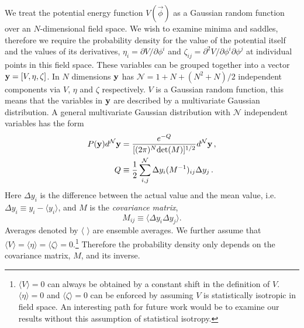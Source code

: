 \documentclass[12pt]{article}
\newcommand{\sh}[1]{\textcolor{brown}{#1}}
\begin{document}
We treat the potential energy function $V({\vec{\phi}})$ as a Gaussian random function over an $N$-dimensional field space. We wish to examine minima and saddles, therefore we require the probability density for the value of the potential itself and the values of its derivatives, $\eta_i = \partial V/\partial \phi^i$ and $\zeta_{ij}=\partial^2 V/\partial \phi^i\partial \phi^j$ at individual points in this field space. These variables can be grouped together into a vector ${\bf y} = [V,\eta,\zeta]$. In $N$ dimensions ${\bf y}$ has $\mathcal{N}=1+N+(N^2+N)/2$ independent components via $V$, $\eta$ and $\zeta$ respectively. $V$ is a Gaussian random function, this means that the variables in ${\bf y}$ are described by a multivariate Gaussian distribution. A general multivariate Gaussian distribution with $\mathcal{N}$ independent variables has the form
%
%
%
%
\begin{equation} \label{MultivariateGaussian}
\begin{split}
P({\bf y})d^\mathcal{N}{\bf y} &= \frac{e^{-Q}}{[(2\pi)^N \mathrm{det}(M)]^{1/2}} d^\mathcal{N}{\bf y} \, ,\\
Q &\equiv \frac{1}{2} \sum_{i,j}^\mathcal{N} \Delta y_i (M^{-1})_{ij} \Delta y_{j} \, .\\
\end{split}
\end{equation}
%
Here $\Delta y_i$ is the difference between the actual value and the mean value, i.e. $\Delta y_i \equiv y_i - \langle y_i \rangle$, and $M$ is the \emph{covariance matrix}, 
%
\begin{equation}
M_{ij} \equiv \langle \Delta y_i \Delta y_j \rangle.
\end{equation}
%
Averages denoted by $\langle \,\,\rangle$ are ensemble averages. We further assume that $\langle V\rangle = \langle \eta\rangle = \langle \zeta\rangle = 0$.\footnote{$\langle V\rangle=0$ can always be obtained by a constant shift in the definition of $V$. $\langle \eta \rangle = 0$ and $\langle \zeta\rangle = 0$ can be enforced by assuming $V$ is statistically isotropic in field space. An interesting path for future work would be to examine our results without this assumption of statistical isotropy.} Therefore the probability density only depends on the covariance matrix, $M$, and its inverse.
\end{document}
